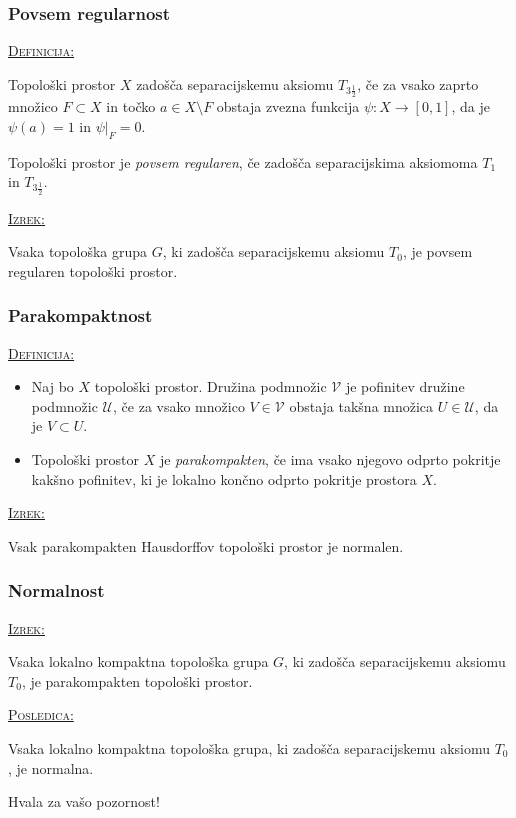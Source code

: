 \documentclass[a4paper, 12pt]{beamer}
\newenvironment{matematika}[1]{
\textcolor{bostonuniversityred}{\underline{\textsc{#1:}}}
}{
}
\begin{document}
\begin{frame}
\frametitle{Povsem regularnost}
\begin{matematika}{Definicija}
Topološki prostor $X$ zadošča separacijskemu aksiomu $T_{3\frac{1}{2}}$, če za vsako zaprto množico $F \subset X$ in točko $a \in X \setminus F$ obstaja zvezna funkcija $\psi: X \to [0,1]$, da je $\psi(a) = 1$ in $\psi|_F = 0$.
\end{matematika}\newline

Topološki prostor je \emph{povsem regularen}, če zadošča separacijskima aksiomoma $T_1$ in $T_{3\frac{1}{2}}$. \newline

\begin{matematika}{Izrek}
Vsaka topološka grupa $G$, ki zadošča separacijskemu aksiomu $T_0$, je povsem regularen topološki prostor.
\end{matematika}
\end{frame}

\begin{frame}
\frametitle{Parakompaktnost}
\begin{matematika}{Definicija}
\begin{itemize}
\item
Naj bo $X$ topološki prostor. Družina podmnožic $\mathcal{V}$ je pofinitev družine podmnožic $\mathcal{U}$, če za vsako množico $V \in \mathcal{V}$ obstaja takšna množica $U \in \mathcal{U}$, da je $V \subset U$.
\item
Topološki prostor $X$ je \emph{parakompakten}, če ima vsako njegovo odprto pokritje kakšno pofinitev, ki je lokalno končno odprto pokritje prostora $X$.\newline
\end{itemize}
\end{matematika}
\begin{matematika}{Izrek}
Vsak parakompakten Hausdorffov topološki prostor je normalen.
\end{matematika}
\end{frame}

\begin{frame}
\frametitle{Normalnost}
\begin{matematika}{Izrek}
Vsaka lokalno kompaktna topološka grupa $G$, ki zadošča separacijskemu aksiomu $T_0$, je parakompakten topološki prostor.
\end{matematika}\newline\newline

\begin{matematika}{Posledica}
Vsaka lokalno kompaktna topološka grupa, ki zadošča separacijskemu aksiomu $T_0$, je normalna.
\end{matematika}
\end{frame}

\begin{frame}
\centering
Hvala za vašo pozornost!
\end{frame}
\end{document}
